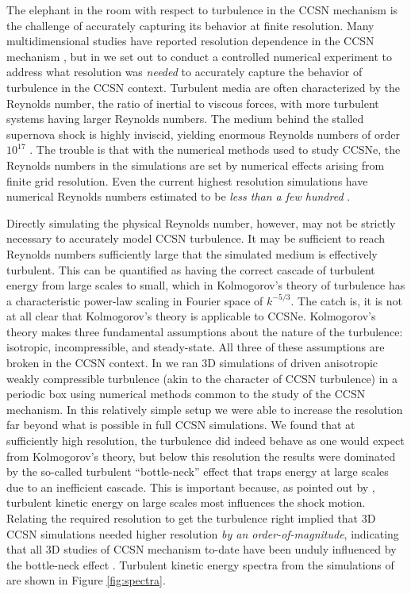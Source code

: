 The elephant in the room with respect to turbulence in the CCSN mechanism is the challenge of accurately capturing its behavior at finite resolution.
Many multidimensional studies have reported resolution dependence in the CCSN mechanism \citep[e.g.,][]{Hanke:2012, Couch:2013, Couch:2014, Takiwaki:2014, Abdikamalov:2015}, but in \citet*{Radice:2015} we set out to conduct a controlled numerical experiment to address what resolution was {\it needed} to accurately capture the behavior of turbulence in the CCSN context.
Turbulent media are often characterized by the Reynolds number, the ratio of inertial to viscous forces, with more turbulent systems having larger Reynolds numbers.
The medium behind the stalled supernova shock is highly inviscid, yielding enormous Reynolds numbers of order $10^{17}$ \citep{Abdikamalov:2015}.
The trouble is that with the numerical methods used to study CCSNe, the Reynolds numbers in the simulations are set by numerical effects arising from finite grid resolution.
Even the current highest resolution simulations have numerical Reynolds numbers estimated to be {\it less than a few hundred} \citep{Couch:2015, Abdikamalov:2015}.


Directly simulating the physical Reynolds number, however, may not be strictly necessary to accurately model CCSN turbulence.
It may be sufficient to reach Reynolds numbers sufficiently large that the simulated medium is effectively turbulent.
This can be quantified as having the correct cascade of turbulent energy from large scales to small, which in Kolmogorov's theory of turbulence has a characteristic power-law scaling in Fourier space of $k^{-5/3}$.
The catch is, it is not at all clear that Kolmogorov's theory is applicable to CCSNe.
Kolmogorov's theory makes three fundamental assumptions about the nature of the turbulence: isotropic, incompressible, and steady-state.
All three of these assumptions are broken in the CCSN context.
In \citet*{Radice:2015} we ran 3D simulations of driven anisotropic weakly compressible turbulence (akin to the character of CCSN turbulence) in a periodic box using numerical methods common to the study of the CCSN mechanism.
In this relatively simple setup we were able to increase the resolution far beyond what is possible in full CCSN simulations.
We found that at sufficiently high resolution, the turbulence did indeed behave as one would expect from Kolmogorov's theory, but below this resolution the results were dominated by the so-called turbulent ``bottle-neck'' effect that traps energy at large scales due to an inefficient cascade.
This is important because, as pointed out by \citet{Couch:2015}, turbulent kinetic energy on large scales most influences the shock motion.
Relating the required resolution to get the turbulence right implied that 3D CCSN simulations needed higher resolution {\it by an order-of-magnitude}, indicating that all 3D studies of CCSN mechanism to-date have been unduly influenced by the bottle-neck effect \citep[see also][]{Abdikamalov:2015}.
Turbulent kinetic energy spectra from the simulations of \citet*{Radice:2015} are shown in Figure \ref{fig:spectra}.

